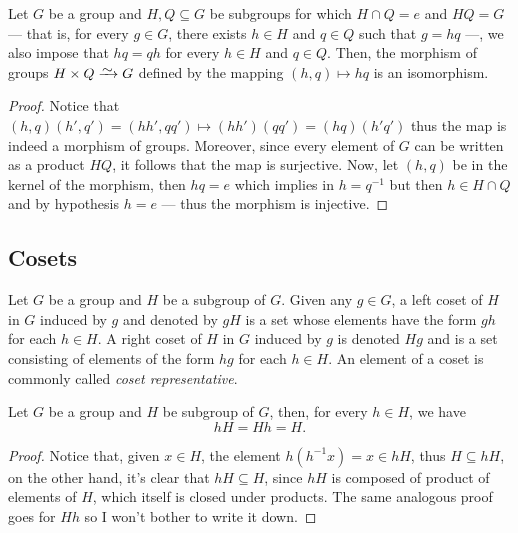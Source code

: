 \begin{proposition}
\label{prop:product-subgroups-isomorphism}
Let \(G\) be a group and \(H, Q \subseteq G\) be subgroups for which \(H \cap Q
= e\) and \(H Q = G\) --- that is, for every \(g \in G\), there exists \(h \in
H\) and \(q \in Q\) such that \(g = h q\) ---, we also impose that \(h q = q h\)
for every \(h \in H\) and \(q \in Q\). Then, the morphism of groups \(H \times Q
\isoto G\) defined by the mapping \((h, q) \mapsto hq\) is an isomorphism.
\end{proposition}

\begin{proof}
Notice that \((h, q)(h', q') = (h h', q q') \mapsto (hh')(qq') = (hq)(h'q')\)
thus the map is indeed a morphism of groups. Moreover, since every element of
\(G\) can be written as a product \(HQ\), it follows that the map is
surjective. Now, let \((h, q)\) be in the kernel of the morphism, then \(hq =
e\) which implies in \(h = q^{-1}\) but then \(h \in H \cap Q\) and by
hypothesis \(h = e\) --- thus the morphism is injective.
\end{proof}

\subsection{Cosets}

\begin{definition}[Coset]
\label{def:coset}
Let \(G\) be a group and \(H\) be a subgroup of \(G\). Given any \(g \in G\), a
left coset of \(H\) in \(G\) induced by \(g\) and denoted by \(g H\) is a set
whose elements have the form \(g h\) for each \(h \in H\). A right coset of
\(H\) in \(G\) induced by \(g\) is denoted \(H g\) and is a set consisting of
elements of the form \(h g\) for each \(h \in H\). An element of a coset is
commonly called \emph{coset representative}.
\end{definition}

\begin{corollary}
Let \(G\) be a group and \(H\) be subgroup of \(G\), then, for every \(h \in
H\), we have
\[
    h H = H h = H.
\]
\end{corollary}

\begin{proof}
Notice that, given \(x \in H\), the element \(h (h^{-1} x) = x \in h H\), thus
\(H \subseteq h H\), on the other hand, it's clear that \(hH \subseteq H\),
since \(hH\) is composed of product of elements of \(H\), which itself is closed
under products. The same analogous proof goes for \(Hh\) so I won't bother to
write it down.
\end{proof}

